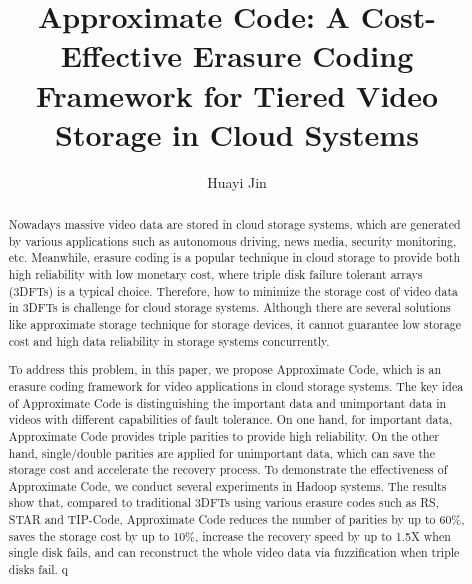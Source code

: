 \documentclass[sigconf]{acmart}
\begin{document}
\title{Approximate Code: A Cost-Effective Erasure Coding Framework for Tiered Video Storage in Cloud Systems}

\author{Huayi Jin}



\begin{abstract}
Nowadays massive video data are stored in cloud storage systems, which are generated by various applications such as autonomous driving, news media, security monitoring, etc. Meanwhile, erasure coding is a popular technique in cloud storage to provide both high reliability with low monetary cost, where triple disk failure tolerant arrays (3DFTs) is a typical choice. Therefore, how to minimize the storage cost of video data in 3DFTs is challenge for cloud storage systems. Although there are several solutions like approximate storage technique for storage devices, it cannot guarantee low storage cost and high data reliability in storage systems concurrently.

To address this problem, in this paper, we propose Approximate Code, which is an erasure coding framework for video applications in cloud storage systems. The key idea of Approximate Code is distinguishing the important data and unimportant data in videos with different capabilities of fault tolerance. On one hand, for important data, Approximate Code provides triple parities to provide high reliability. On the other hand, single/double parities are applied for unimportant data, which can save the storage cost and accelerate the recovery process. To demonstrate the effectiveness of Approximate Code, we conduct several experiments in Hadoop systems. The results show that, compared to traditional 3DFTs using various erasure codes such as RS, STAR and TIP-Code, Approximate Code reduces the number of parities by up to 60\%, saves the storage cost by up to 10\%, increase the recovery speed by up to 1.5X when single disk fails, and can reconstruct the whole video data via fuzzification when triple disks fail.
                                                                    q
\end{abstract}
\end{document}
